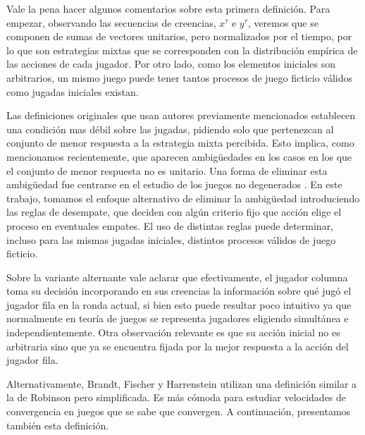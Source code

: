 Vale la pena hacer algunos comentarios sobre esta primera definición. Para empezar, observando las secuencias de creencias, $x^\tau$ e $y^\tau$, veremos que se componen de sumas de vectores unitarios, pero normalizados por el tiempo, por lo que son estrategias mixtas que se corresponden con la distribución empírica de las acciones de cada jugador. Por otro lado, como los elementos iniciales son arbitrarios, un mismo juego puede tener tantos procesos de juego ficticio válidos como jugadas iniciales existan.

Las definiciones originales que usan autores previamente mencionados establecen una condición mas débil sobre las jugadas, pidiendo solo que pertenezcan al conjunto de menor respuesta a la estrategia mixta percibida. Esto implica, como mencionamos recientemente, que aparecen ambigüedades en los casos en los que el conjunto de menor respuesta no es unitario. Una forma de eliminar esta ambigüedad fue centrarse en el estudio de los juegos no degenerados \cite{browns:original}. En este trabajo, tomamos el enfoque alternativo de eliminar la ambigüedad introduciendo las reglas de desempate, que deciden con algún criterio fijo que acción elige el proceso en eventuales empates. El uso de distintas reglas puede determinar, incluso para las mismas jugadas iniciales, distintos procesos válidos de juego ficticio.

Sobre la variante alternante vale aclarar que efectivamente, el jugador columna toma su decisión incorporando en sus creencias la información sobre qué jugó el jugador fila en la ronda actual, si bien esto puede resultar poco intuitivo ya que normalmente en teoría de juegos se representa jugadores eligiendo simultánea e independientemente. Otra observación relevante es que su acción inicial no es arbitraria sino que ya se encuentra fijada por la mejor respuesta a la acción del jugador fila.

Alternativamente, Brandt, Fischer y Harrenstein \cite{brandt:rate:convergence} utilizan una definición similar a la de Robinson \cite{robinson:zerosum} pero simplificada. Es más cómoda para estudiar velocidades de convergencia en juegos que se sabe que convergen. A continuación, presentamos también esta definición.

